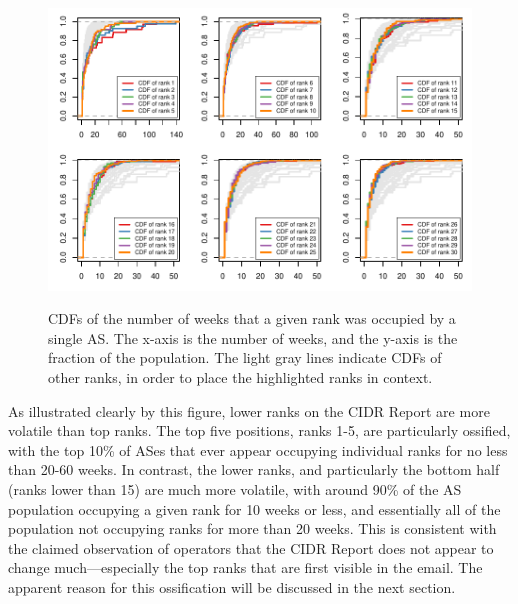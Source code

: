 \begin{figure}[h!]
\begin{centering}
\begin{singlespace}
    \includegraphics[width=6in]{figures/cr_rank_cdfs.pdf}
    \vspace{-2em}\\
    \caption[CDFs of the number of weeks that a given rank was occupied by a
    single AS]{CDFs of the number of weeks that a given rank was occupied by a
    single AS. The x-axis is the number of weeks, and the y-axis is the
    fraction of the population. The light gray lines indicate CDFs of other
    ranks, in order to place the highlighted ranks in context.}
    \label{fig:rank_cdfs}
\end{singlespace}
\end{centering}
\end{figure}

As illustrated clearly by this figure, lower ranks on the CIDR Report are more
volatile than top ranks. The top five positions, ranks 1-5, are particularly
ossified, with the top 10\% of ASes that ever appear occupying individual ranks
for no less than 20-60 weeks. In contrast, the lower ranks, and particularly
the bottom half (ranks lower than 15) are much more volatile, with around
90\% of the AS population occupying a given rank for 10 weeks or less, and
essentially all of the population not occupying ranks for more than 20
weeks. This is consistent with the claimed observation of operators that
the CIDR Report does not appear to change much---especially the top ranks
that are first visible in the email. The apparent reason for this ossification
will be discussed in the next section.

